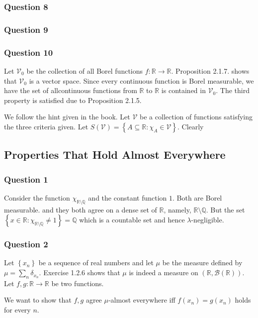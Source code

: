 \documentclass[12pt]{article}
\theoremstyle{definition}
\theoremstyle{remark}
\theoremstyle{plain}
\newcommand{\R}{\mathbb R}
\newcommand{\Q}{\mathbb Q}
\newcommand{\scrB}{{\mathscr B}}
\newcommand{\scrV}{{\mathscr V}}
\begin{document}
\subsubsection{Question 8}

\subsubsection{Question 9}

\subsubsection{Question 10}
Let $\scrV _0$ be the collection of all Borel functions $f:\R \to \R$. Proposition 2.1.7. shows that $\scrV _ 0$ is a vector space. Since every continuous function is Borel measurable, we have the set of allcontinuous functions from $\R$ to $\R$ is contained in $\scrV _0$. The third property is satisfied due to Proposition 2.1.5.

We follow the hint given in the book. Let $\scrV$ be a collection of functions satisfying the three criteria given. Let $S\left( \scrV \right)=\left\{ A\subseteq \R : \chi_{A} \in \scrV \right\}$. Clearly


\newpage

\subsection{Properties That Hold Almost Everywhere}
\subsubsection{Question 1}
Consider the function $\chi _{\R\setminus\Q}$ and the constant function $1$. Both are Borel measurable. and they both agree on a dense set of $\R$, namely, $\R\setminus \Q$. But the set $\left\{ x\in\R : \chi_{\R \setminus \Q} \ne 1 \right\}=\Q$ which is a countable set and hence $\lambda$-negligible.

\subsubsection{Question 2}
Let $\left\{ x_n \right\}$ be a sequence of real numbers and let $\mu$ be the measure defined by $\mu = \sum_n \delta_{x_n}$. Exercise 1.2.6 shows that $\mu$ is indeed a measure on $\left( \R , \scrB \left( \R \right) \right)$. Let $f,g : \R \to \R $ be two functions.

We want to show that $f,g$ agree $\mu$-almost everywhere iff $f(x_n)=g(x_n)$ holds for every $n$.
\end{document}
